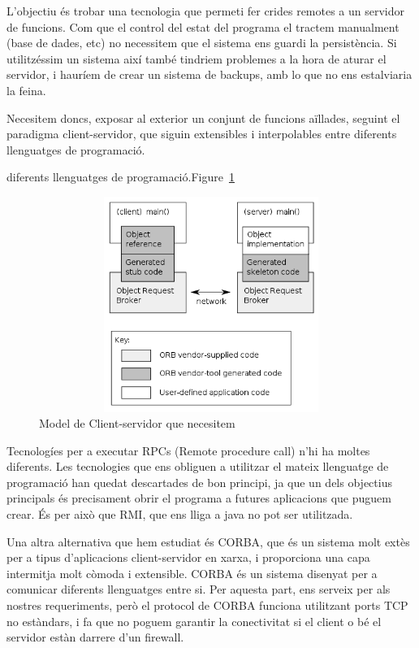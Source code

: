 \documentclass[titlepage,a4paper,12pt]{book}
\begin{document}
	   L'objectiu és trobar una tecnologia que permeti fer crides remotes a un servidor
	   de funcions.  Com que el control del estat del programa el tractem manualment
	   (base de dades, etc) no necessitem que el sistema ens guardi la persistència.
	   Si utilitzéssim un sistema així també tindriem problemes a la hora de aturar el
	   servidor, i hauríem de crear un sistema de backups, amb lo que no ens
	   estalviaria la feina.

	   Necesitem doncs, exposar al exterior un conjunt de funcions aïllades, seguint el
	   paradigma client-servidor, que siguin extensibles i interpolables entre
	   diferents llenguatges de programació.

	   diferents llenguatges de programació.Figure~\ref{fig:401px-Orb.png}

	   \begin{figure}[h]
	   \centering
	   \includegraphics[width=13cm,height=7cm]{401px-Orb.png}
	   \caption{Model de Client-servidor que necesitem}
	   \label{fig:401px-Orb.png}
	   \end{figure} 

	   Tecnologíes per a executar RPCs (Remote procedure call) n'hi ha moltes
	   diferents. Les tecnologies que ens obliguen a utilitzar el mateix llenguatge de
programació han quedat descartades de bon principi, ja que un dels objectius
principals és precisament obrir el programa a futures aplicacions que puguem
crear.  És per això que RMI, que ens lliga a java no pot ser utilitzada.  

Una altra alternativa que hem estudiat és CORBA, que és un sistema molt extès
per a tipus d'aplicacions client-servidor en xarxa, i proporciona una capa
intermitja molt còmoda i extensible.  CORBA és un sistema disenyat per a
comunicar diferents llenguatges entre si.  Per aquesta part, ens serveix per als
nostres requeriments, però el protocol de CORBA funciona utilitzant ports TCP
no estàndars, i fa que no poguem garantir la conectivitat si el client o bé el
servidor estàn darrere d'un firewall.
\end{document}
